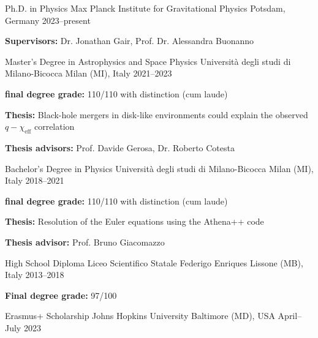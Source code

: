 


\begin{cventries}
\cventry
{Ph.D. in Physics} %
{Max Planck Institute for Gravitational Physics} %
{Potsdam, Germany} %
{2023--present} %
{ %
\begin{cvitems}
	\item {\textbf{Supervisors:} Dr. Jonathan Gair, Prof. Dr. Alessandra Buonanno}
\end{cvitems}
}
\cventry
{Master's Degree in Astrophysics and Space Physics} %
{Università degli studi di Milano-Bicocca} %
{Milan (MI), Italy} %
{2021--2023} %
{ %
\begin{cvitems}
	\item {\textbf{final degree grade:} 110/110 with distinction (cum laude)}
	\item {\textbf{Thesis:} Black-hole mergers in disk-like environments could explain  the observed $q-\chi_\mathrm{eff}$ correlation}
	\item {\textbf{Thesis advisors:} Prof. Davide Gerosa, Dr. Roberto Cotesta}
\end{cvitems}
}

\cventry
{Bachelor's Degree in Physics} %
{Università degli studi di Milano-Bicocca} %
{Milan (MI), Italy} %
{2018--2021} %
{ %
\begin{cvitems}
	\item {\textbf{final degree grade:} 110/110 with distinction (cum laude)}
	\item {\textbf{Thesis:} Resolution of the Euler equations using the Athena++ code}
	\item {\textbf{Thesis advisor:} Prof. Bruno Giacomazzo}
\end{cvitems}
}

\cventry
{High School Diploma} %
{Liceo Scientifico Statale Federigo Enriques} %
{Lissone (MB), Italy} %
{2013--2018} %
{ %
\begin{cvitems}
	\item {\textbf{Final degree grade:} 97/100}
\end{cvitems}
}
\end{cventries}


\begin{cventries}

\cventry
{Erasmus+ Scholarship} %
{Johns Hopkins University} %
{Baltimore (MD), USA} %
{April--July 2023} %
{}

\end{cventries}